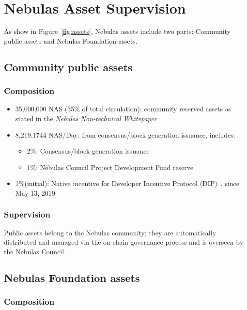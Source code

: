 \section{Nebulas Asset Supervision}

\label{supervision}

As show in Figure~\ref{fig:assets}, Nebulas assets include two parts: Community public assets and Nebulas Foundation assets.

\subsection{Community public assets}

\subsubsection{Composition}

\begin{itemize}
	\item 35,000,000 NAS (35\% of total circulation): community reserved assets as stated in the \textit{Nebulas Non-technical Whitepaper}
    \item 8,219.1744 NAS/Day: from consensus/block generation issuance, includes:
	    \begin{itemize}
			\item 2\%: Consensus/block generation issuance
			\item 1\%: Nebulas Council Project Development Fund reserve
		\end{itemize}
	\item 1\%(initial): Native incentive for Developer Incentive Protocol (DIP)~\cite{mauvepaper}, since May 13, 2019
\end{itemize}

\subsubsection{Supervision}

Public assets belong to the Nebulas community; they are automatically distributed and managed via the on-chain governance process and is overseen by the Nebulas Council.

\subsection{Nebulas Foundation assets}

\subsubsection{Composition}


